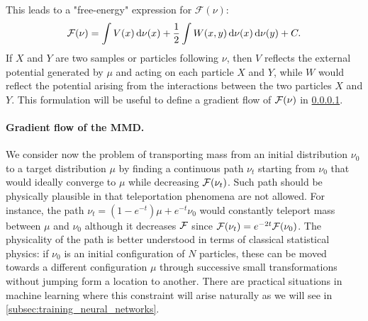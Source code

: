 This leads to a "free-energy" expression for $\mathcal{F}(\nu)$:
\begin{align}\label{eq:mmd_as_free_energy}
	{{\mathcal F}}(\nu) = \int V(x) \mathop{}\!\mathrm{d} \nu(x) +\frac{1}{2} \int W(x,y)\mathop{}\!\mathrm{d} \nu(x)\mathop{}\!\mathrm{d} \nu(y) + C.
\end{align}
If $X$ and $Y$ are two samples or particles following $\nu$, then $V$ reflects the external potential generated by $\mu$ and acting on each particle $X$ and $Y$, while $W$ would reflect the potential arising from the interactions between the two particles $X$ and $Y$. This formulation will be useful to define a gradient flow of ${{\mathcal F}}(\nu)$ in \cref{paragraph:flow_MMD}. 
\paragraph{Gradient flow of the MMD.}\label{paragraph:flow_MMD}
We consider now the problem of transporting mass from an initial distribution $\nu_0$ to a target distribution $\mu$ by finding a continuous path $\nu_t$ starting from $\nu_0$ that would ideally converge to $\mu$ while decreasing ${{\mathcal F}}(\nu_t)$. Such path should be physically plausible in that  teleportation phenomena are not allowed. For instance, the path $\nu_t = (1-e^{-t})\mu + e^{-t}\nu_0$ would constantly teleport mass between $\mu$ and $\nu_0$ although it decreases  ${{\mathcal F}}$ since ${{\mathcal F}}(\nu_t)=e^{-2t}{{\mathcal F}}(\nu_0)$. The physicality of the path is better understood in terms of classical statistical physics: if $\nu_0$ is an initial configuration of $N$ particles, these can be moved towards a different configuration $\mu$ through successive small transformations without jumping form a location to another. There are practical situations in machine learning where this constraint will arise naturally as we will see in \cref{subsec:training_neural_networks}. 

